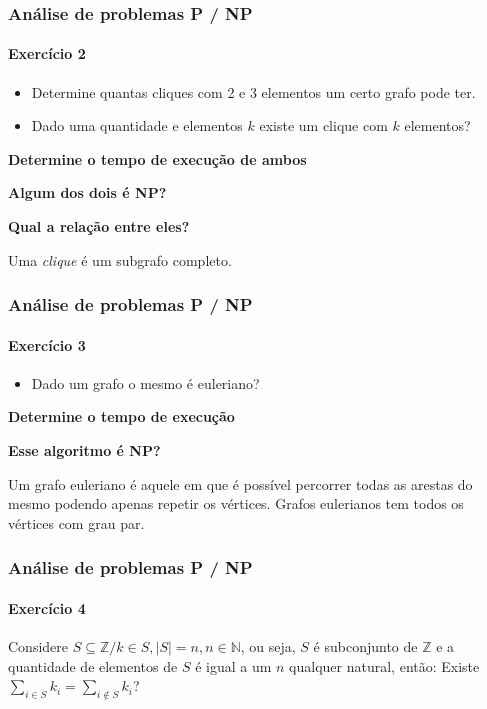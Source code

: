 \begin{frame}
	\frametitle{Análise de problemas P / NP}
	\framesubtitle{Exercício 2}
	\begin{itemize}
		\item Determine quantas cliques com 2 e 3 elementos um certo grafo pode ter.
		\item Dado uma quantidade e elementos $k$ existe um clique com $k$ elementos?
	\end{itemize}
	\par \textbf{Determine o tempo de execução de ambos}
	\par \textbf{Algum dos dois é NP?}
	\par \textbf{Qual a relação entre eles?}\newline
	
	\par Uma \textit{clique} é um subgrafo completo.
\end{frame}

\begin{frame}
	\frametitle{Análise de problemas P / NP}
	\framesubtitle{Exercício 3}
	\begin{itemize}
		\item Dado um grafo o mesmo é euleriano?
	\end{itemize}
	\par \textbf{Determine o tempo de execução}
	\par \textbf{Esse algoritmo é NP?}\newline
	
	\par Um grafo euleriano é aquele em que é possível percorrer todas as arestas do mesmo podendo apenas repetir os vértices. Grafos eulerianos tem todos os vértices com grau par.
\end{frame}

\begin{frame}
	\frametitle{Análise de problemas P / NP}
	\framesubtitle{Exercício 4}
	\par Considere $S \subseteq \mathbb{Z} / k \in S, |S| = n, n \in \mathbb{N}$, ou seja, $S$ é subconjunto de $\mathbb{Z}$ e a quantidade de elementos de $S$ é igual a um $n$ qualquer natural, então: Existe $\sum_{i \in S} k_i = \sum_{i \notin S} k_i$?
\end{frame}
